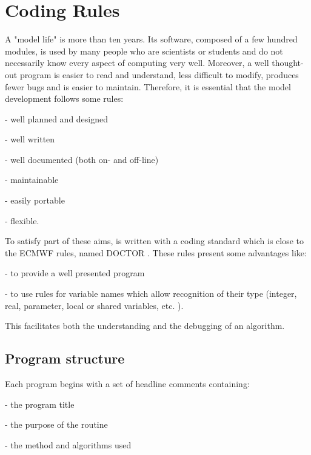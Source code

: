 \documentclass[../main/NEMO_manual]{subfiles}
\begin{document}
\chapter{Coding Rules}
\label{apdx:D}

\minitoc

\newpage

A "model life" is more than ten years.
Its software, composed of a few hundred modules, is used by many people who are scientists or students and
do not necessarily know every aspect of computing very well.
Moreover, a well thought-out program is easier to read and understand, less difficult to modify,
produces fewer bugs and is easier to maintain.
Therefore, it is essential that the model development follows some rules:

- well planned and designed

- well written

- well documented (both on- and off-line)

- maintainable

- easily portable

- flexible.

To satisfy part of these aims, \NEMO is written with a coding standard which is close to the ECMWF rules,
named DOCTOR \citep{Gibson_TR86}. 
These rules present some advantages like:

- to provide a well presented program

- to use rules for variable names which allow recognition of their type
(integer, real, parameter, local or shared variables, etc. ). 

This facilitates both the understanding and the debugging of an algorithm.

\section{Program structure}
\label{sec:D_structure}

Each program begins with a set of headline comments containing:

- the program title

- the purpose of the routine

- the method and algorithms used
\end{document}
